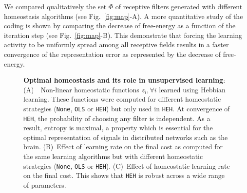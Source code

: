 \documentclass[a4paper, 11pt, draft]{article} %
\newcommand{\dico}{\Phi} %
\begin{document}
We compared qualitatively the set $\dico$ of receptive filters generated with different homeostasis algorithms (see Fig.~\ref{fig:map}-A). A more quantitative study of the coding is shown by comparing the decrease of free-energy as a function of the iteration step (see Fig.~\ref{fig:map}-B). This demonstrate that forcing the learning activity to be uniformly spread among all receptive fields results in a faster convergence of the representation error as represented by the decrease of free-energy.
\begin{figure}[!ht]%
\caption{
{\bf Optimal homeostasis and its role in unsupervised learning}:
{\sf (A)}~~Non-linear homeostatic functions $z_i, \forall i$ learned using Hebbian learning. These functions were computed for different homeostatic strategies (\texttt{None}, \texttt{OLS} or \texttt{HEH}) but only used in \texttt{HEH}. At convergence of \texttt{HEH}, the probability of choosing any filter is independent. As a result, entropy is maximal, a property which is essential for the optimal representation of signals in distributed networks such as the brain.
{\sf (B)}~Effect of learning rate on the final cost as computed for the same learning algorithms but with different homeostatic strategies (\texttt{None}, \texttt{OLS} or \texttt{HEH}).
{\sf (C)}~Effect of homeostatic learning rate on the final cost. This shows that \texttt{HEH} is robust across a wide range of parameters.
}
\end{figure}
\end{document}
